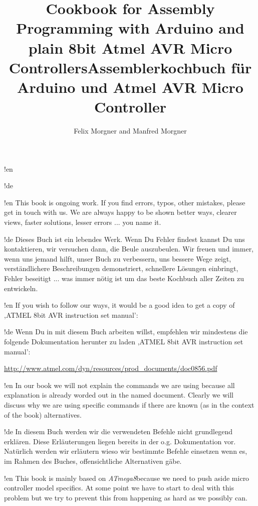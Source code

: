 \documentclass[twoside,12pt,authoryear,openright,a4paper]{book}
\newcommand{\at}{\textit{ATmega8}}
\begin{document}

!en \title{Cookbook for Assembly Programming with Arduino and plain 8bit Atmel AVR Micro Controllers}
!de \title{Assemblerkochbuch für Arduino und Atmel AVR Micro Controller}

\author{Felix Morgner and Manfred Morgner}


\maketitle

!en This book is ongoing work. If you find errors, typos, other mistakes, please get in touch with us. We are always happy to be shown better ways, clearer views, faster solutions, lesser errors ... you name it.

!de Dieses Buch ist ein lebendes Werk. Wenn Du Fehler findest kannst Du uns kontaktieren, wir versuchen dann, die Beule auszubeulen. Wir freuen und immer, wenn uns jemand hilft, unser Buch zu verbessern, uns bessere Wege zeigt, verständlichere Beschreibungen demonstriert, schnellere Lösungen einbringt, Fehler beseitigt ... was immer nötig ist um das beste Kochbuch aller Zeiten zu entwickeln.



!en If you wish to follow our ways, it would be a good idea to get a copy of ,ATMEL 8bit AVR instruction set manual':

!de Wenn Du in mit diesem Buch arbeiten willst, empfehlen wir mindestens die folgende Dokumentation herunter zu laden ,ATMEL 8bit AVR instruction set manual':

\url{http://www.atmel.com/dyn/resources/prod_documents/doc0856.pdf}



!en In our book we will not explain the commands we are using because all explanation is already worded out in the named document. Clearly we will discuss why we are using specific commands if there are known (as in the context of the book) alternatives.

!de In diesem Buch werden wir die verwendeten Befehle nicht grundlegend erklären. Diese Erläuterungen liegen bereits in der o.g. Dokumentation vor. Natürlich werden wir erläutern wieso wir bestimmte Befehle einsetzen wenn es, im Rahmen des Buches, offensichtliche Alternativen gäbe.



!en This book is mainly based on \at because we need to push aside micro controller model specifics. At some point we have to start to deal with this problem but we try to prevent this from happening as hard as we possibly can.
\end{document}
